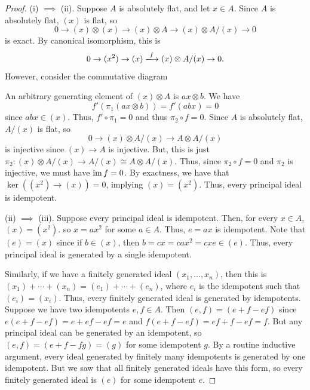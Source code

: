 \begin{proof}
(i) $\implies$ (ii). Suppose $A$ is absolutely flat, and let $x \in A$. Since $A$ is absolutely flat, $(x)$ is flat, so
$$0 \to (x) \otimes (x) \to (x) \otimes A \to (x) \otimes A/(x) \to 0$$
is exact. By canonical isomorphism, this is
$$0 \to (x^2) \to (x) \xlongrightarrow{f} (x) \otimes A/(x) \to 0.$$
However, consider the commutative diagram
\begin{center}
\end{center}
An arbitrary generating element of $(x) \otimes A$ is $ax \otimes b$. We have 
$$f'(\pi_1(ax \otimes b)) = f'(abx) = 0$$
since $abx \in (x)$. Thus, $f' \circ \pi_1 = 0$ and thus $\pi_2 \circ f = 0$. Since $A$ is absolutely flat, $A/(x)$ is flat, so
$$0 \to (x) \otimes A/(x) \to A \otimes A/(x)$$
is injective since $(x) \to A$ is injective. But, this is just $\pi_2 : (x) \otimes A/(x) \to A/(x) \cong A \otimes A/(x)$. Thus, since $\pi_2 \circ f = 0$
and $\pi_2$ is injective, we must have $\operatorname{im} f = 0$. By exactness, we have that $\ker((x^2) \to (x)) = 0$, implying $(x) = (x^2)$. Thus, every principal ideal is idempotent.

(ii) $\implies$ (iii). Suppose every principal ideal is idempotent. Then, for every $x \in A$, $(x) = (x^2)$. so $x = ax^2$ for some $a \in A$. Thus, $e = ax$ is idempotent.
Note that $(e) = (x)$ since if $b \in (x)$, then $b = cx = cax^2 = cxe \in (e)$. Thus, every principal ideal is generated by a single idempotent.

Similarly, if we have a finitely generated ideal $(x_1,\ldots,x_n)$, then this is $(x_1) + \cdots + (x_n) = (e_1) + \cdots + (e_n)$, where $e_i$ is the idempotent such that
$(e_i) = (x_i)$. Thus, every finitely generated ideal is generated by idempotents. Suppose we have two idempotents $e,f \in A$. Then $(e,f) = (e + f - ef)$ since $e(e + f - ef) = e + ef - ef = e$ 
and $f(e + f - ef) = ef + f - ef = f$. But any principal ideal can be generated by an idempotent, so $(e,f) = (e+f-fg) = (g)$ for some idempotent $g$. By a routine inductive argument,
every ideal generated by finitely many idempotents is generated by one idempotent. But we saw that all finitely generated ideals have this form, so every finitely generated ideal is $(e)$ for
some idempotent $e$.


\end{proof}
